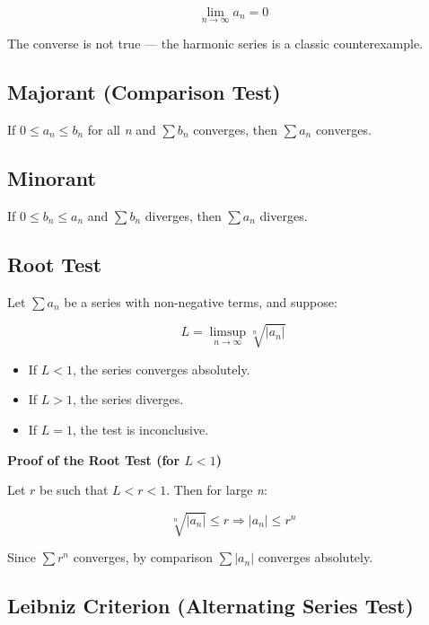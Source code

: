 \[
    \lim_{n \to \infty} a_n = 0
\]

The converse is not true — the harmonic series is a classic counterexample.

\subsection{Majorant (Comparison Test)} 

If \(0 \le a_n \le b_n\) for all \emph{n} and \(\sum b_n\) converges, then \(\sum a_n\) converges.

\subsection{Minorant} 

If \(0 \le b_n \le a_n\) and \(\sum b_n\) diverges, then \(\sum a_n\) diverges.

\subsection{Root Test}

Let \(\sum a_n\) be a series with non-negative terms, and suppose:

\[
    L = \limsup_{n \to \infty} \sqrt[n]{|a_n|}
\]

\begin{itemize}

  \item If \(L < 1\), the series converges absolutely.

  \item If \(L > 1\), the series diverges.


  \item If \(L = 1\), the test is inconclusive.

\end{itemize}

\textbf{Proof of the Root Test (for \(L < 1\))}

Let \(r\) be such that \(L < r < 1\). Then for large \emph{n}:

\[
    \sqrt[n]{|a_n|} \le r \Rightarrow |a_n| \le r^n
\]

Since \(\sum r^n\) converges, by comparison \(\sum |a_n|\) converges absolutely.

\subsection{Leibniz Criterion (Alternating Series Test)}

